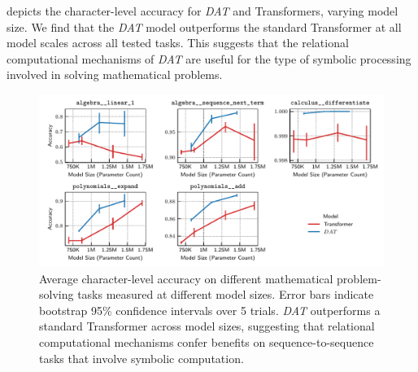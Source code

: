  depicts the character-level accuracy for \textit{DAT} and Transformers, varying model size. We find that the \textit{DAT} model outperforms the standard Transformer at all model scales across all tested tasks. This suggests that the relational computational mechanisms of \textit{DAT} are useful for the type of symbolic processing involved in solving mathematical problems.




\begin{figure}[t]
    \includegraphics[width=\textwidth]{figs/experiments/math/math_accuracy_scaling.pdf}
    \caption{Average character-level accuracy on different mathematical problem-solving tasks measured at different model sizes. Error bars indicate bootstrap 95\% confidence intervals over 5 trials. \textit{DAT} outperforms a standard Transformer across model sizes, suggesting that relational computational mechanisms confer benefits on sequence-to-sequence tasks that involve symbolic computation.}\label{fig:math_scaling}
\end{figure}

